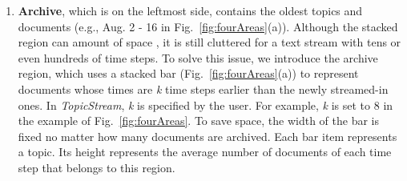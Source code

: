 \begin{enumerate}
\item \textbf{\normalsize Archive}, which is on the leftmost side, contains the oldest topics and documents (e.g., Aug. 2 - 16 in Fig.~\ref{fig:fourAreas}(a)).
Although the stacked region can  amount of space , it is still cluttered for a text stream with tens or even hundreds of time steps.
To solve this issue, we introduce the archive region,
which uses a stacked bar (Fig.~\ref{fig:fourAreas}(a)) to represent documents whose times are \emph{\normalsize k} time steps earlier than the newly streamed-in ones.
In \emph{\normalsize TopicStream}, \emph{\normalsize k} is specified by the user.
For example, \emph{\normalsize k} is set to 8 in the example of Fig.~\ref{fig:fourAreas}.
To save space, the width of the bar is fixed no matter how many documents are archived.
Each bar item represents a topic.
Its height represents the average number of documents of each time step that belongs to this region.



\end{enumerate}

